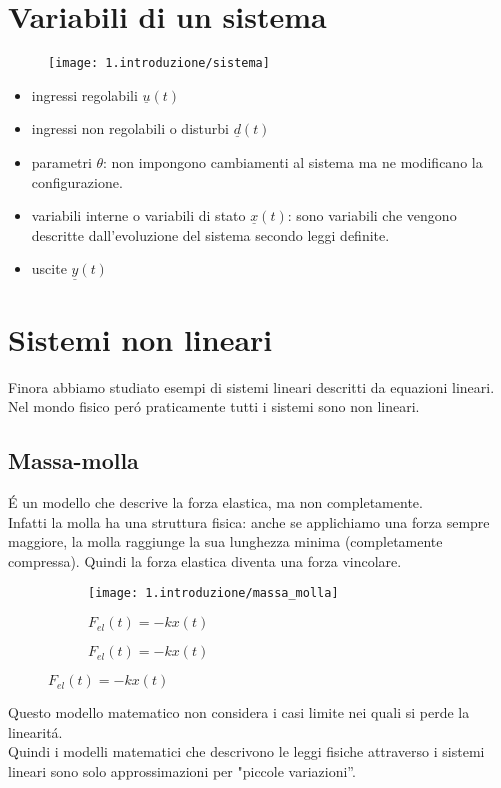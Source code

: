 \documentclass[../main.tex]{subfiles}
\begin{document}
	\section{Variabili di un sistema}
			\begin{figure}[h!]
				\centering
				\texttt{[image: 1.introduzione/sistema]}
			\end{figure}
			\begin{itemize}
				\item ingressi regolabili $ \underline u(t) $
				\item ingressi non regolabili o disturbi $ \underline d(t) $
				\item parametri $ \theta $: non impongono cambiamenti al sistema ma ne modificano la configurazione.
				\item variabili interne o variabili di stato $ \underline x(t) $: sono variabili che vengono descritte dall'evoluzione del sistema secondo leggi definite.
				\item uscite $ \underline y(t) $
			\end{itemize}
		
	\section{Sistemi non lineari}
		Finora abbiamo studiato esempi di sistemi lineari descritti da equazioni lineari. Nel mondo fisico per\'o praticamente tutti i sistemi sono non lineari.
		
	\subsection{Massa-molla}
		\'E un modello che descrive la forza elastica, ma non completamente.\\
		Infatti la molla ha una struttura fisica: anche se applichiamo una forza sempre maggiore, la molla raggiunge la sua lunghezza minima (completamente compressa). Quindi la forza elastica diventa una forza vincolare.\\
		\begin{figure}[h!]
			\centering
			\begin{subfigure}[b]{0.4\linewidth}
				\texttt{[image: 1.introduzione/massa\_molla]}
				\caption{$F_{el}(t)=-kx(t)$}
			\end{subfigure}
			\quad \quad
			\begin{subfigure}[b]{0.4\linewidth}
				\caption{$F_{el}(t)=-kx(t)$}
			\end{subfigure}
		\end{figure}
		Questo modello matematico non considera i casi limite nei quali si perde la linearit\'a.\\
		Quindi i modelli matematici che descrivono le leggi fisiche attraverso i sistemi lineari sono solo approssimazioni per "piccole variazioni''.
		
\end{document}
